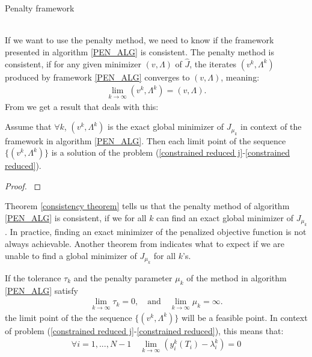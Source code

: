 \\
\\
\begin{algorithm}[H] 
\caption{Penalty framework\label{PEN_ALG}}
\end{algorithm}
\noindent
\\
If we want to use the penalty method, we need to know if the framework presented in algorithm \ref{PEN_ALG} is consistent. The penalty method is consistent, if for any given minimizer $(v,\Lambda)$ of $\hat J$, the iterates $(v^k,\Lambda^k)$ produced by framework \ref{PEN_ALG} converges to $(v,\Lambda)$, meaning:
\begin{align*}
\lim_{k\rightarrow \infty} (v^k,\Lambda^k) =(v,\Lambda).
\end{align*}
From \cite{nocedal2006numerical} we get a result that deals with this:
\begin{theorem} \label{consistency theorem}
Assume that $\forall k$, $(v^k,\Lambda^k)$ is the exact global minimizer of $J_{\mu_k}$ in context of the framework in algorithm \ref{PEN_ALG}. Then each limit point of the sequence $\{(v^k,\Lambda^k)\}$ is a solution of the problem (\ref{constrained reduced j}-\ref{constrained reduced}).
\end{theorem}
\begin{proof}
\cite{nocedal2006numerical}
\end{proof}
\noindent
Theorem \ref{consistency theorem} tells us that the penalty method of algorithm \ref{PEN_ALG} is consistent, if we for all $k$ can find an exact global minimizer of $J_{\mu_k}$. In practice, finding an exact minimizer of the penalized objective function is not always achievable. Another theorem from \cite{nocedal2006numerical} indicates what to expect if we are unable to find a global minimizer of $J_{\mu_k}$ for all $k$'s.
\begin{theorem} \label{feasible theorem}
If the tolerance $\tau_k$ and the penalty parameter $\mu_k$ of the method in algorithm \ref{PEN_ALG} satisfy
\begin{align*}
\lim_{k\rightarrow\infty} \tau_k =0,\quad \textrm{and} \quad \lim_{k\rightarrow\infty} \mu_k = \infty.
\end{align*}
the limit point of the the sequence $\{(v^k,\Lambda^k)\}$ will be a feasible point. In context of problem (\ref{constrained reduced j}-\ref{constrained reduced}), this means that:
\begin{align*}
\forall i=1,...,N-1\quad\lim_{k\rightarrow\infty}(y_{i}^k(T_i)-\lambda_i^k)=0 
\end{align*}
\end{theorem}
